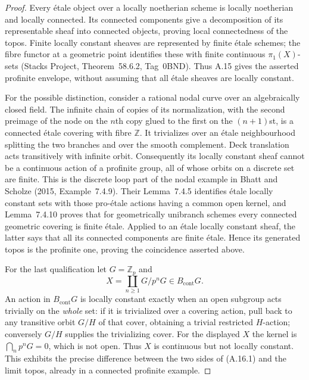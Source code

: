 \begin{proof}
Every étale object over a locally noetherian scheme is locally noetherian and locally connected. Its connected components give a decomposition of its representable sheaf into connected objects, proving local connectedness of the topos. Finite locally constant sheaves are represented by finite étale schemes; the fibre functor at a geometric point identifies these with finite continuous $\pi_1(X)$-sets (Stacks Project, Theorem~58.6.2, Tag~0BND). Thus A.15 gives the asserted profinite envelope, without assuming that all étale sheaves are locally constant.

For the possible distinction, consider a rational nodal curve over an algebraically closed field. The infinite chain of copies of its normalization, with the second preimage of the node on the $n$th copy glued to the first on the $(n+1)$st, is a connected étale covering with fibre $\mathbb Z$. It trivializes over an étale neighbourhood splitting the two branches and over the smooth complement. Deck translation acts transitively with infinite orbit. Consequently its locally constant sheaf cannot be a continuous action of a profinite group, all of whose orbits on a discrete set are finite. This is the discrete loop part of the nodal example in Bhatt and Scholze (2015, Example~7.4.9). Their Lemma~7.4.5 identifies étale locally constant sets with those pro-étale actions having a common open kernel, and Lemma~7.4.10 proves that for geometrically unibranch schemes every connected geometric covering is finite étale. Applied to an étale locally constant sheaf, the latter says that all its connected components are finite étale. Hence its generated topos is the profinite one, proving the coincidence asserted above.

For the last qualification let $G=\mathbb Z_p$ and
\[
 X=\coprod_{n\ge1}G/p^nG\in B_{\mathrm{cont}}G.
\]
An action in $B_{\mathrm{cont}}G$ is locally constant exactly when an open subgroup acts trivially on the \emph{whole} set: if it is trivialized over a covering action, pull back to any transitive orbit $G/H$ of that cover, obtaining a trivial restricted $H$-action; conversely $G/H$ supplies the trivializing cover. For the displayed $X$ the kernel is $\bigcap_np^nG=0$, which is not open. Thus $X$ is continuous but not locally constant. This exhibits the precise difference between the two sides of (A.16.1) and the limit topos, already in a connected profinite example. 
\end{proof}

